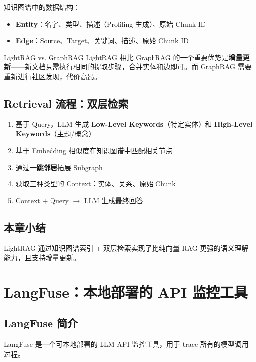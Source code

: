 \documentclass[a4paper]{article}
\begin{document}
知识图谱中的数据结构：
\begin{itemize}
    \item \textbf{Entity}：名字、类型、描述（Profiling 生成）、原始 Chunk ID
    \item \textbf{Edge}：Source、Target、关键词、描述、原始 Chunk ID
\end{itemize}

\begin{knowledgebox}{LightRAG vs. GraphRAG}
LightRAG 相比 GraphRAG 的一个重要优势是\textbf{增量更新}——新文档只需执行相同的提取步骤，合并实体和边即可。而 GraphRAG 需要重新进行社区发现，代价高昂。
\end{knowledgebox}

\subsection{Retrieval 流程：双层检索}

\begin{enumerate}
    \item 基于 Query，LLM 生成 \textbf{Low-Level Keywords}（特定实体）和 \textbf{High-Level Keywords}（主题/概念）
    \item 基于 Embedding 相似度在知识图谱中匹配相关节点
    \item 通过\textbf{一跳邻居}拓展 Subgraph
    \item 获取三种类型的 Context：实体、关系、原始 Chunk
    \item Context + Query $\rightarrow$ LLM 生成最终回答
\end{enumerate}

\subsection{本章小结}

LightRAG 通过知识图谱索引 + 双层检索实现了比纯向量 RAG 更强的语义理解能力，且支持增量更新。

\section{LangFuse：本地部署的 API 监控工具}

\subsection{LangFuse 简介}

LangFuse 是一个可本地部署的 LLM API 监控工具，用于 trace 所有的模型调用过程。
\end{document}
